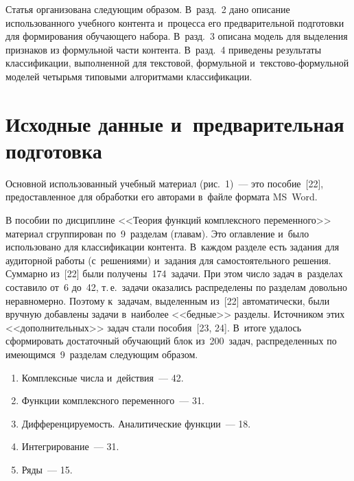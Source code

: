 \begin{multicols}{2}
     Статья организована сле\-ду\-ющим образом. В~разд.~2 дано 
описание использованного учебного контента и~процесса его 
предварительной подготовки для формирования обуча\-юще\-го набора. 
В~разд.~3 описана модель для выделения при\-зна\-ков из формульной 
час\-ти контента. В~разд.~4 приведены результаты классификации, 
выполненной для текс\-то\-вой, формульной и~текс\-то\-во-фор\-муль\-ной 
моделей четырьмя типовыми алгоритмами классификации.
     
\section{Исходные данные и~предварительная подготовка}

      Основной использованный учебный материал (рис.~1)~--- это 
пособие~[22], пред\-остав\-лен\-ное для обработки его авторами в~файле формата 
MS~Word.
      


      В пособии по дисциплине <<Теория функций комплексного 
переменного>> материал сгруппирован по~9~разделам (главам). Это 
оглав\-ле\-ние и~было использовано для классификации контента. В~каж\-дом 
разделе есть задания для аудиторной работы (с~решениями) и~задания для 
самостоятельного решения. Суммарно из~[22] были получены~174~задачи. 
При этом чис\-ло задач в~разделах со\-ста\-ви\-ло от~6 до~42, т.\,е.\ задачи 
оказались распределены по разделам довольно неравномерно. Поэтому 
к~задачам, выделенным из~[22] автоматически, были вруч\-ную до\-бав\-ле\-ны 
задачи в~наиболее <<бед\-ные>> разделы. Источником этих 
<<дополнительных>> задач стали пособия~[23, 24]. В~итоге удалось 
сформировать достаточный обуча\-ющий блок из~200~задач, рас\-пре\-де\-лен\-ных 
по име\-ющим\-ся~9~разделам сле\-ду\-ющим образом. 
      \begin{enumerate}[1.]
\item  Комплексные числа и~действия~--- 42. 
\item  Функции комплексного переменного~--- 31. 
\item Дифференцируемость. Аналитические функции~--- 18. 
\item Интегрирование~--- 31. 
\item Ряды~--- 15. 
\end{enumerate}

{ \begin{center}  %
 \vspace*{9pt}
    \mbox{%
\epsfxsize=79mm
}

\vspace*{6pt}




\end{center}}
\end{multicols}
